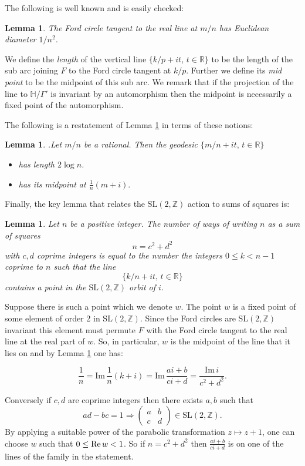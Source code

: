 \documentclass[12pt,a4paper]{amsart}
\newtheorem{lem}[thm]{Lemma}
\def\HH{\mathbb{H}}
\def\im{\mathrm{Im}\,}
\def\xx{\HH/\Gamma'}
\def\ZZ{\mathbb{Z}}
\def\RR{\mathbb{R}}
\def\sl2{\mathrm{SL}(2, \ZZ)}
\begin{document}
The following is well known and is easily checked:

\begin{lem}\label{ford}
The Ford circle tangent to the real line at $m/n$
has Euclidean diameter $1/n^2$.
\end{lem}


We define the \textit{length} of the vertical line 
$\{ k/p + i t,\, t \in \RR \}$
to be the length of the  sub arc joining 
$F$ to the Ford circle tangent at $k/p$.
Further we define its  \textit{mid point} to be the midpoint of this sub arc.
We remark that if the projection of the line to $\xx$
is invariant by an automorphism 
then the midpoint is necessarily a fixed point of the automorphism.

The following is a restatement of Lemma \ref{ford} in terms of these notions:

\begin{lem}.\label{calcul}
Let $m/n$ be a rational. 
Then the geodesic $\{ m/n + i t,\, t \in \RR \}$
\begin{itemize}
\item has  length $2\log n$. 
\item has its midpoint at $ \frac{1 }{n}(m + i).$
\end{itemize}
\end{lem}

Finally, the key lemma that relates the $\sl2$ action to sums of squares is:

\begin{lem} \label{squares}
Let $n$ be a positive integer.
The number of  ways of writing $n$  as a  sum of squares
$$n = c^2 + d^2$$
with $c,d$ coprime integers
is equal to the number the  integers $0 \leq k < n-1$ coprime to $n$
such that the line
$$\{  k/n + i t,\, t \in \RR \}$$
contains  a point in the $\sl2$  orbit of $i$.
\end{lem}


\proof  Suppose there is such  a point which we denote  $w$.
The point $w$ is a fixed point of some  element of order 2 in $\sl2$.
Since the Ford circles are $\sl2$ invariant
this element must permute $F$ with the Ford circle tangent 
to the real line  at the real part of $w$.
So, in particular, $w$ is the midpoint of the line 
that it lies on 
and by  Lemma \ref{calcul} one has:

$$\frac{1}{n} = \im \frac{1 }{n}(k + i)  
= \im  \frac{ai +b}{ci+d }
= \frac{\im i} {c^2 + d^2}.$$

Conversely if $c,d$ are coprime integers 
 then there exists $a,b$ such that
 $$ad - bc = 1 \Rightarrow  
 \begin{pmatrix}
 a & b \\
 c & d
 \end{pmatrix} \in \sl2.
$$
By applying a suitable power of the parabolic transformation 
$z \mapsto z + 1$,
one can choose $w$ such that $0 \leq \text{Re\,} w < 1$.
So if $n = c^2 + d^2$ then $\frac{ai +b}{ci+d }$
is on one of the lines of the family in the statement.
\end{document}
